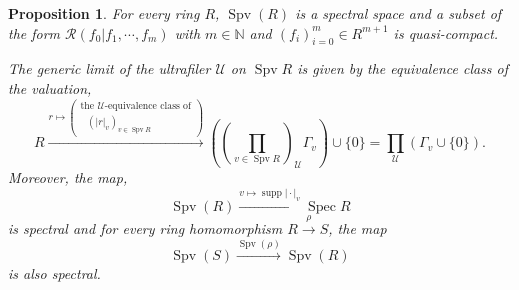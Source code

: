 \documentclass[8pt]{article}
\numberwithin{equation}{section}
\newtheorem{proposition}{Proposition}[subsection]
\DeclareMathOperator{\supp}{supp}
\DeclareMathOperator{\Spec}{Spec}
\DeclareMathOperator{\Spv}{Spv}
\newcommand{\N}[0]{\mathbb{N}}
\newcommand{\U}[0]{\mathcal{U}}
\newcommand{\cR}[0]{\mathcal{R}}
\newcommand{\ab}[1]{\vert #1 \vert}
\begin{document}
\begin{proposition}
    \label{propostion_6_1}
    For every ring $R$, $\Spv(R)$ is a spectral space and a subset of the form $\cR(f_0|f_1,\cdots,f_m)$ with $m\in\N$ and $(f_i)_{i=0}^m\in R^{m+1}$ is quasi-compact.
    \par The generic limit of the ultrafiler $\U$ on $\Spv R$ is given by the equivalence class of the valuation,
    \begin{equation}
        R\stackrel{r\mapsto \left(\substack{\text{the $\U$-equivalence class of}\\\text{ $(\ab{r}_v)_{v\in\Spv R}$}}\right)}{\longrightarrow}\left(\left({\prod_{v\in\Spv R}}\right)_\U\Gamma_v\right)\cup\{0\}=\prod_\U(\Gamma_v\cup\{0\}).\label{proposition_6_1_1}
    \end{equation}
    Moreover, the map,
    \begin{equation*}
        \Spv(R)\stackrel{v\mapsto \supp\ab{\cdot}_v}{\longrightarrow}\Spec R
    \end{equation*}
    is spectral and for every ring homomorphism $R\stackrel{\rho}{\to}S$, the map 
    \begin{equation*}
        \Spv(S)\stackrel{\Spv(\rho)}{\to}\Spv(R)
    \end{equation*}
    is also spectral.
\end{proposition}
\end{document}
